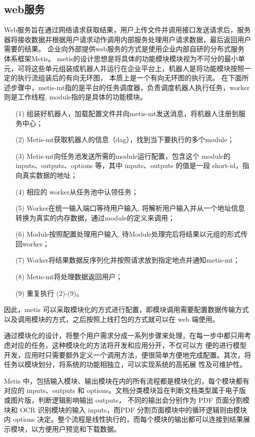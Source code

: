 \subsection{web服务}

Web服务旨在通过网络请求获取结果，用户上传文件并调用接口发送请求后，服务器将接收数据并根据用户请求动作调用内部服务处理用户请求数据，最后返回用户需要的结果。
企业向外部提供web服务的方式是使用企业内部自研的分布式服务体系框架Metis。
metis的设计思想是将具体的功能模块模块视为不可分的最小单元，可将这些单元组装成机器人并运行在企业平台上，机器人是将功能模块按照一定的执行流组装后的有向无环图，
本质上是一个有向无环图的执行流。
在下面所述步骤中，metis-mt指的是平台的任务调度器，负责调度机器人执行任务，worker则是工作线程, module指的是具体的功能模块。

\begin{enumerate}
    \item[(1)] 组装好机器人，加载配置文件并向metis-mt发送消息，将机器人注册到服务中心；
    \item[(2)] Metis-mt获取机器人的信息（dag），找到当下要执行的多个module；
    \item[(3)] Metis-mt向任务池发送所需的module运行配置，包含这个 module的 inputs、outputs、options 等，其中 inputs、outputs 的值是一段 short-id，指向真实数据的地址；
    \item[(4)] 相应的 worker从任务池中认领任务；
    \item[(5)] Worker在统一输入端口等待用户输入, 将解析用户输入并从一个地址信息转换为真实的内存数据，通过module的定义来调用；
    \item[(6)] Module按照配置处理用户输入, 待Module处理完后将结果以元组的形式传回worker；
    \item[(7)] Worker将结果数据反序列化并按照请求放到指定地点并通知metis-mt；
    \item[(8)] Metis-mt将处理数据返回用户；
    \item[(9)] 重复执行 (2)-(9)。
\end{enumerate}


因此，metis 可以采取模块化的方式进行配置，即模块调用需要配置数据传输方式以及调用模块的方式，之后按照上线打包的方式就可以在 web 端使用。

通过模块化的设计，将整个用户需求分成一系列步骤来处理，在每一步中都只用考虑对应的任务，这种模块化的方法将开发和应用分开，不仅可以方
便的进行模型开发，应用时只需要额外定义一个调用方法，便很简单方便地完成配置。其次，将任务以模块划分，将系统的功能相独立，可以实现系统的高拓展
性及可维护性。

Metis 中，包括输入模块、输出模块在内的所有流程都是模块化的，每个模块都有对应的 inputs、outputs 和 options。文档分类模块旨在判断文档类型属于电子版或图片版，判断逻辑影响输出 outputs，
不同的输出会分别作为 PDF 页面分割模块和 OCR 识别模块的输入 inputs，而PDF 分割页面模块中的循环逻辑则由模块内 options 决定。整个流程是线性执行的，而每个模块的输出都可以连接到结果展示模块，以方便用户预览和下载数据。

